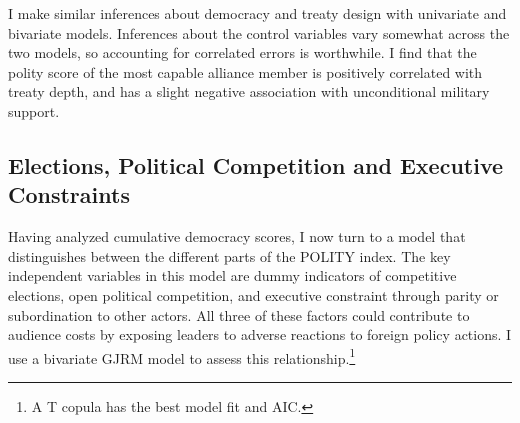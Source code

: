 \documentclass[12pt]{article}
\begin{document}
I make similar inferences about democracy and treaty design with univariate and bivariate models.
Inferences about the control variables vary somewhat across the two models, so accounting for correlated errors is worthwhile.   
I find that the polity score of the most capable alliance member is positively correlated with treaty depth, and has a slight negative association with unconditional military support.


\subsection{Elections, Political Competition and Executive Constraints} 


Having analyzed cumulative democracy scores, I now turn to a model that distinguishes between the different parts of the POLITY index. 
The key independent variables in this model are dummy indicators of competitive elections, open political competition, and executive constraint through parity or subordination to other actors. 
All three of these factors could contribute to audience costs by exposing leaders to adverse reactions to foreign policy actions. 
I use a bivariate GJRM model to assess this relationship.\footnote{A T copula has the best model fit and AIC.} 
\end{document}
